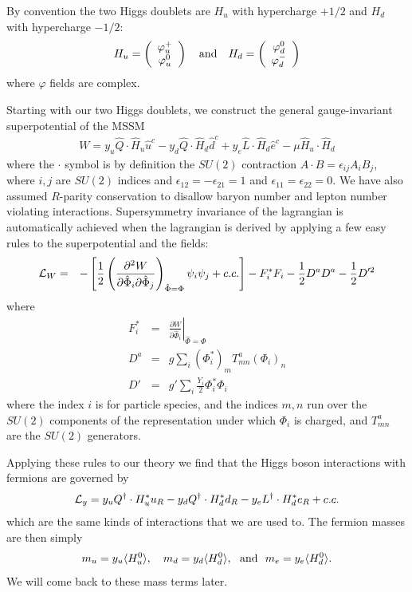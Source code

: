 \documentclass[12pt]{article}
\def\beq{\begin{eqnarray}}
\def\eeq{\end{eqnarray}}
\def\bea{\begin{eqnarray}}
\def\eea{\end{eqnarray}}
\def\vector#1#2{\left( \begin{array}{c}#1\\ #2\end{array}\right)}
\begin{document}
By  convention the two Higgs doublets are $H_u$ with hypercharge $+1/2$ and $H_d$ with hypercharge $-1/2$:
\beq
H_u=\vector{\varphi_u^+}{\varphi^0_u}~~~{\rm and}~~~
H_d=\vector{\varphi_d^0}{\varphi_d^-}
\eeq
where $\varphi$ fields are complex.

Starting with our two Higgs doublets, we construct the  general gauge-invariant superpotential of the MSSM 
\beq
W=y_u \hat Q\cdot\hat H_u \hat u^c-y_d\hat Q\cdot\hat H_d \hat d^c+y_e\hat L\cdot \hat H_d\hat e^c
-\mu \hat H_u\cdot \hat H_d
\eeq
where the $\cdot$ symbol is by definition the $SU(2)$ contraction $A\cdot B=\epsilon_{ij} A_iB_j$, where $i,j$ are $SU(2)$ indices and $\epsilon_{12}=-\epsilon_{21}=1$ and $\epsilon_{11}=\epsilon_{22}=0$. We have also assumed $R$-parity conservation to disallow baryon number and lepton number violating interactions. Supersymmetry invariance of the lagrangian is automatically achieved when the lagrangian is derived by applying a few easy rules to the superpotential and the fields:
\beq
{\cal L}_W &=&-\left[ \frac{1}{2}\left( \frac{\partial^2W}{\partial\hat \Phi_i\partial\hat\Phi_j}\right)_{\hat \Phi=\Phi}\psi_i\psi_j+c.c.\right] -F_i^*F_i-\frac{1}{2}D^a D^a-\frac{1}{2}D'^2
\label{eq:susylag}
\eeq
where
\bea
F^*_i&=&\left. \frac{\partial W}{\partial \hat\Phi_i}\right|_{\hat\Phi=\Phi} \\
D^a & = & g\sum_i (\Phi^*_i)_m T^a_{mn} (\Phi_i)_n \\
D' & = & g' \sum_i \frac{Y_i}{2}\Phi^*_i\Phi_i 
\eea
where the index $i$ is for particle species, and the indices $m,n$ run over the $SU(2)$ components of the representation under which $\Phi_i$ is charged, and $T^a_{mn}$ are the $SU(2)$ generators.

Applying these rules to our theory we find that the Higgs boson interactions with fermions are governed by
\beq
{\cal L}_y= y_u Q^\dagger\cdot H^*_u u_R-y_d  Q^\dagger\cdot H^*_d d_R-y_e L^\dagger\cdot H^*_d e_R + c.c.
\eeq
which are the same kinds of interactions that we are used to.  The fermion masses are then simply 
\beq
m_{u}=y_u \langle H^0_u\rangle, ~~~m_d=y_d\langle H^0_d\rangle,~~{\rm and}~~
m_e=y_e \langle H^0_d\rangle .
\eeq
We will come back to these mass terms later.
\end{document}
